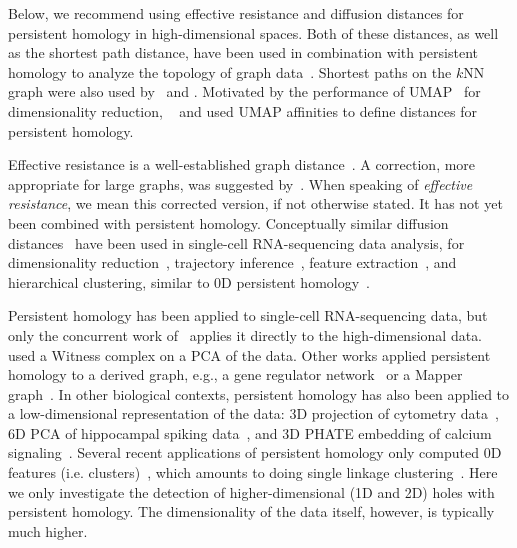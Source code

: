\documentclass{article}
\theoremstyle{plain}
\theoremstyle{definition}
\theoremstyle{remark}
\begin{document}
Below, we recommend using effective resistance and diffusion distances for persistent homology in high-dimensional spaces. Both of these distances, as well as the shortest path distance, have been used in combination with persistent homology to analyze the topology of graph data~\citep{petri2013networks, hajij2018visual, aktas2019persistence,tran2019scale, carriere2020perslay, memoli2022persistent, davies2023persistent}. Shortest paths on the $k$NN graph were also used by~\citet{naitzat2020topology} and \citet{fernandez2023intrinsic}. Motivated by the performance of UMAP~\citep{mcinnes2018umap} for dimensionality reduction, ~\citet{gardner2022toroidal} and \citet{hermansen2024uncovering} used UMAP affinities to define distances for persistent homology.

Effective resistance is a well-established graph distance~\citep{doyle1984random, fouss2016algorithms}. A correction, more appropriate for large graphs, was suggested by~\citet{luxburg2010getting, von2014hitting}. When speaking of \textit{effective resistance}, we mean this corrected version, if not otherwise stated. It has not yet been combined with persistent homology. Conceptually similar diffusion distances~\citep{coifman2006diffusion} have been used in single-cell RNA-sequencing data analysis, for dimensionality reduction~\citep{moon2019visualizing}, trajectory inference~\citep{haghverdi2015diffusion}, feature extraction~\citep{chew2022manifold}, and hierarchical clustering, similar to 0D persistent homology~\citep{brugnone2019coarse, kuchroo2023single}. 

Persistent homology has been applied to single-cell RNA-sequencing data, but only the concurrent work of~\citet{flores2023unraveling} applies it directly to the high-dimensional data. \citet{wang2023cannot} used a Witness complex on a PCA of the data. Other works applied persistent homology to a derived graph, e.g., a gene regulator network~\citep{masoomy2021topological} or a Mapper graph~\citep{singh2007topological, rizvi2017single}. In other biological contexts, persistent homology has also been applied to a low-dimensional representation of the data: 3D projection of cytometry data~\citep{mukherjee2022determining}, 6D PCA of hippocampal spiking data~\citep{gardner2022toroidal}, and 3D PHATE embedding of calcium signaling~\citep{moore2023cell}. Several recent applications of persistent homology only computed 0D features (i.e. clusters)~\citep{hajij2018visual, jia2022single, petenkaya2022identifying}, which amounts to doing single linkage clustering~\citep{gower1969minimum}. Here we only investigate the detection of higher-dimensional (1D and 2D) holes with persistent homology. The dimensionality of the data itself, however, is typically much higher.
\end{document}
